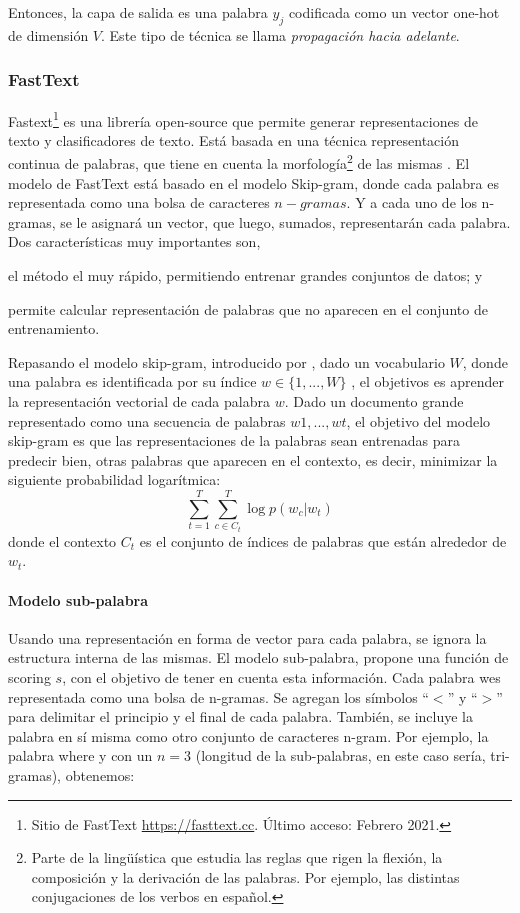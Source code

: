 \bigskip Entonces, la capa de salida es una palabra \(y_j\) codificada como un vector one-hot de dimensión \(V\). Este tipo de técnica se llama \textit{propagación hacia adelante}.

\subsubsection{FastText}
Fastext\footnote{Sitio de FastText \url{https://fasttext.cc}. Último acceso: Febrero 2021.} es una librería open-source que permite generar representaciones de texto y clasificadores de texto. Está basada en una técnica representación continua de palabras, que tiene en cuenta la morfología\footnote{Parte de la lingüística que estudia las reglas que rigen la flexión, la composición y la derivación de las palabras. Por ejemplo, las distintas conjugaciones de los verbos en español.} de las mismas \citep{bojanowski2017enriching}.
El modelo de FastText está basado en el modelo Skip-gram, donde cada palabra es representada como una bolsa de caracteres \(n-gramas\). Y a cada uno de los n-gramas, se le asignará un vector, que luego, sumados, representarán cada palabra. Dos características muy importantes son, \begin{enumerate*} [label=(\roman*)] \item el método el muy rápido, permitiendo entrenar grandes conjuntos de datos; y \item permite calcular representación de palabras que no aparecen en el conjunto de entrenamiento.  \end{enumerate*}

\bigskip Repasando el modelo skip-gram, introducido por \cite{mikolov2013efficient}, dado un vocabulario \(W\), donde una palabra es identificada por su índice \(w \in \{1,... , W\}\) , el objetivos es aprender la representación vectorial de cada palabra \(w\). Dado un documento grande representado como una secuencia de palabras \(w1, ..., wt\), el objetivo del modelo skip-gram es que las representaciones de la palabras sean entrenadas para predecir bien, otras palabras que aparecen en el contexto, es decir, minimizar la siguiente probabilidad logarítmica:
\[\sum_{t=1}^{T}\sum_{c \in C_t}^{T}{\log p(w_c | w_t)}\]
donde el contexto \(C_t\) es el conjunto de índices de palabras que están alrededor de \(w_t\).

\paragraph{Modelo sub-palabra}
Usando una representación en forma de vector para cada palabra, se ignora la estructura interna de las mismas. El modelo sub-palabra, propone una función de scoring \(s\), con el objetivo de tener en cuenta esta información.
Cada palabra wes representada como una bolsa de n-gramas. Se agregan los símbolos ``\(<\)'' y ``\(>\)'' para delimitar el principio y el final de cada palabra. También, se incluye la palabra en sí misma como otro conjunto de caracteres n-gram. Por ejemplo, la palabra where y con un \(n = 3\) (longitud de la sub-palabras, en este caso sería, tri-gramas), obtenemos:

